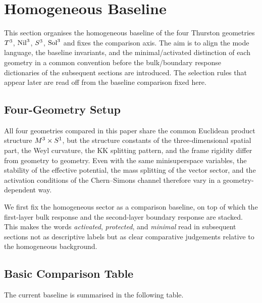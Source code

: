 \section{Homogeneous Baseline}
\label{sec:baseline}

This section organises the homogeneous baseline of the four Thurston
geometries $T^3$, $\mathrm{Nil}^3$, $S^3$, $\mathrm{Sol}^3$ and fixes the
comparison axis.  The aim is to align the mode language, the baseline
invariants, and the minimal/activated distinction of each geometry in a common
convention before the bulk/boundary response dictionaries of the subsequent
sections are introduced.  The selection rules that appear later are read off
from the baseline comparison fixed here.

\subsection{Four-Geometry Setup}
\label{sec:baseline:setup}

All four geometries compared in this paper share the common Euclidean product
structure $M^3\times S^1$, but the structure constants of the
three-dimensional spatial part, the Weyl curvature, the KK splitting pattern,
and the frame rigidity differ from geometry to geometry.  Even with the same
minisuperspace variables, the stability of the effective potential, the mass
splitting of the vector sector, and the activation conditions of the
Chern--Simons channel therefore vary in a geometry-dependent way.

We first fix the homogeneous sector as a comparison baseline, on top of which
the first-layer bulk response and the second-layer boundary response are
stacked.  This makes the words \emph{activated}, \emph{protected}, and
\emph{minimal} read in subsequent sections not as descriptive labels but as
clear comparative judgements relative to the homogeneous background.

\subsection{Basic Comparison Table}
\label{sec:baseline:table}

The current baseline is summarised in the following table.

